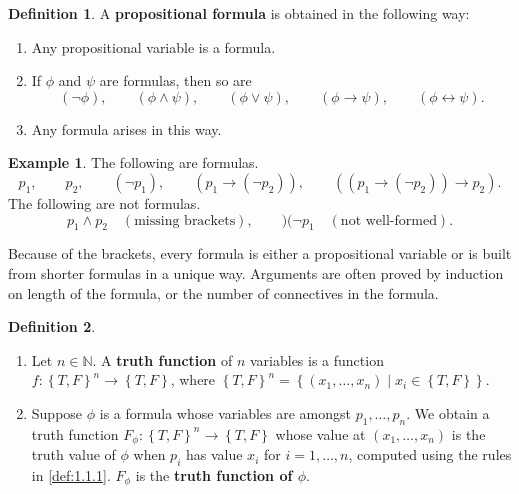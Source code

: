\documentclass{article}
\newcommand{\N}{\mathbb{N}}
\newcommand{\rb}[1]{\left( #1 \right)}
\newcommand{\cb}[1]{\left\{ #1 \right\}}
\newcommand{\notb}[1]{\rb{\neg #1}}
\newcommand{\orb}[2]{\rb{#1 \lor #2}}
\newcommand{\andb}[2]{\rb{#1 \land #2}}
\newcommand{\impb}[2]{\rb{#1 \rightarrow #2}}
\newcommand{\iffb}[2]{\rb{#1 \leftrightarrow #2}}
\theoremstyle{definition}\newtheorem{definition}{Definition}[subsection]
\theoremstyle{definition}\newtheorem{remark}[definition]{Remark}
\theoremstyle{definition}\newtheorem*{example}{Example}
\theoremstyle{definition}\newtheorem*{note}{Note}
\begin{document}
\begin{definition}
\label{def:1.1.2}
A \textbf{propositional formula} is obtained in the following way:
\begin{enumerate}
\item Any propositional variable is a formula.
\item If $ \phi $ and $ \psi $ are formulas, then so are
$$ \notb{\phi}, \qquad \andb{\phi}{\psi}, \qquad \orb{\phi}{\psi}, \qquad \impb{\phi}{\psi}, \qquad \iffb{\phi}{\psi}. $$
\item Any formula arises in this way.
\end{enumerate}
\end{definition}

\begin{example}
The following are formulas.
$$ p_1, \qquad p_2, \qquad \notb{p_1}, \qquad \impb{p_1}{\notb{p_2}}, \qquad \impb{\impb{p_1}{\notb{p_2}}}{p_2}. $$
The following are not formulas.
$$ p_1 \land p_2 \quad \rb{\text{missing brackets}}, \qquad )( \neg p_1 \quad \rb{\text{not well-formed}}. $$
\end{example}

Because of the brackets, every formula is either a propositional variable or is built from shorter formulas in a unique way. Arguments are often proved by induction on length of the formula, or the number of connectives in the formula.

\begin{definition}
\hfill
\begin{enumerate}
\item Let $ n \in \N $. A \textbf{truth function} of $ n $ variables is a function $ f : \cb{T, F}^n \to \cb{T, F} $, where $ \cb{T, F}^n = \cb{\rb{x_1, \dots, x_n} \mid x_i \in \cb{T, F}} $.
\item Suppose $ \phi $ is a formula whose variables are amongst $ p_1, \dots, p_n $. We obtain a truth function $ F_\phi : \cb{T, F}^n \to \cb{T, F} $ whose value at $ \rb{x_1, \dots, x_n} $ is the truth value of $ \phi $ when $ p_i $ has value $ x_i $ for $ i = 1, \dots, n $, computed using the rules in \ref{def:1.1.1}. $ F_\phi $ is the \textbf{truth function of $ \phi$}.
\end{enumerate}
\end{definition}
\end{document}
